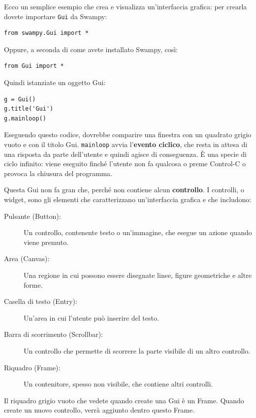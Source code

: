 \documentclass[10pt]{book}
\begin{document}
Ecco un semplice esempio che crea e visualizza un'interfaccia grafica: per crearla dovete importare {\tt Gui} da Swampy:
%
\begin{verbatim}
from swampy.Gui import *
\end{verbatim}
%
Oppure, a seconda di come avete installato Swampy, così:
%
\begin{verbatim}
from Gui import *
\end{verbatim}
%
Quindi istanziate un oggetto Gui:
%
\begin{verbatim}
g = Gui()
g.title('Gui')
g.mainloop()
\end{verbatim}
%
Eseguendo questo codice, dovrebbe comparire una finestra con un quadrato grigio vuoto e con il titolo {\sf Gui}.  {\tt mainloop} avvia l'{\bf evento
  ciclico}, che resta in attesa di una risposta da parte dell'utente e quindi agisce di conseguenza. È una specie di ciclo infinito: viene eseguito finché l'utente non fa qualcosa o preme Control-C o provoca la chiusura del programma.

Questa Gui non fa gran che, perché non contiene alcun
{\bf controllo}. I controlli, o widget, sono gli elementi che caratterizzano un'interfaccia grafica e che includono:

\begin{description}

\item[Pulsante (Button):] Un controllo, contenente testo o un'immagine, che esegue un azione quando viene premuto.

\item[Area (Canvas):] Una regione in cui possono essere disegnate linee, figure geometriche e altre forme.

\item[Casella di testo (Entry):] Un'area in cui l'utente può inserire del testo.

\item[Barra di scorrimento (Scrollbar):] Un controllo che permette di scorrere la parte visibile di un altro controllo.

\item[Riquadro (Frame):] Un contenitore, spesso non visibile, che contiene altri controlli.

\end{description}

Il riquadro grigio vuoto che vedete quando create una Gui è un Frame. Quando create un nuovo controllo, verrà aggiunto dentro questo Frame.
\end{document}
